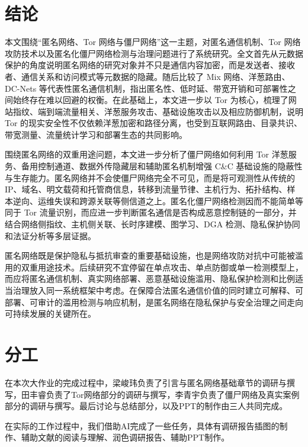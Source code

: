 \section{结论}

本文围绕“匿名网络、Tor 网络与僵尸网络”这一主题，对匿名通信机制、Tor 网络攻防技术以及匿名化僵尸网络检测与治理问题进行了系统研究。全文首先从元数据保护的角度说明匿名网络的研究对象并不只是通信内容加密，而是发送者、接收者、通信关系和访问模式等元数据的隐藏。随后比较了 Mix 网络、洋葱路由、DC-Nets 等代表性匿名通信机制，指出匿名性、低时延、带宽开销和可部署性之间始终存在难以回避的权衡。在此基础上，本文进一步以 Tor 为核心，梳理了网站指纹、端到端流量相关、洋葱服务攻击、基础设施攻击以及相应防御机制，说明 Tor 的现实安全性不仅依赖洋葱加密和路径分离，也受到互联网路由、目录共识、带宽测量、流量统计学习和部署生态的共同影响。

围绕匿名网络的双重用途问题，本文进一步分析了僵尸网络如何利用 Tor 洋葱服务、备用控制通道、数据外传隐藏层和辅助匿名机制增强 C\&C 基础设施的隐蔽性与生存能力。匿名网络并不会使僵尸网络完全不可见，而是将可观测性从传统的 IP、域名、明文载荷和托管商信息，转移到流量节律、主机行为、拓扑结构、样本逆向、运维失误和跨源关联等侧信道之上。匿名化僵尸网络检测因而不能简单等同于 Tor 流量识别，而应进一步判断匿名通信是否构成恶意控制链的一部分，并结合网络侧指纹、主机侧关联、长时序建模、图学习、DGA 检测、隐私保护协同和法证分析等多层证据。



匿名网络既是保护隐私与抵抗审查的重要基础设施，也是网络攻防对抗中可能被滥用的双重用途技术。后续研究不宜停留在单点攻击、单点防御或单一检测模型上，而应将匿名通信机制、真实网络部署、恶意基础设施滥用、隐私保护检测和比例适当治理放入同一系统框架中考虑。在保障合法匿名通信价值的同时建立可解释、可部署、可审计的滥用检测与响应机制，是匿名网络在隐私保护与安全治理之间走向可持续发展的关键所在。

\section{分工}
在本次大作业的完成过程中，梁峻玮负责了引言与匿名网络基础章节的调研与撰写，田丰睿负责了Tor网络部分的调研与撰写，李青宇负责了僵尸网络及真实案例部分的调研与撰写。最后讨论与总结部分，以及PPT的制作由三人共同完成。

在实际的工作过程中，我们借助AI完成了一些任务，具体有调研报告插图的制作、辅助文献的阅读与理解、润色调研报告、辅助PPT制作。